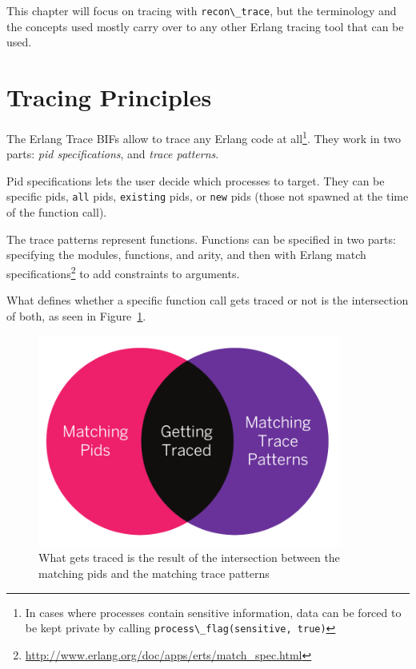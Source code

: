 \documentclass[11pt, oneside]{book}   	%
\newcommand{\module}[1]{\Verb`#1`}
\newcommand{\expression}[1]{\Verb`#1`}
\begin{document}
This chapter will focus on tracing with \module{recon\_trace}, but the terminology and the concepts used mostly carry over to any other Erlang tracing tool that can be used.

\section{Tracing Principles}
\label{sec:tracing-princples}

The Erlang Trace BIFs allow to trace any Erlang code at all\footnote{In cases where processes contain sensitive information, data can be forced to be kept private by calling \expression{process\_flag(sensitive, true)}}. They work in two parts: \emph{pid specifications}, and \emph{trace patterns}.

Pid specifications lets the user decide which processes to target. They can be specific pids, \expression{all} pids, \expression{existing} pids, or \expression{new} pids (those not spawned at the time of the function call).

The trace patterns represent functions. Functions can be specified in two parts: specifying the modules, functions, and arity, and then with Erlang match specifications\footnote{\href{http://www.erlang.org/doc/apps/erts/match\_spec.html}{http://www.erlang.org/doc/apps/erts/match\_spec.html}} to add constraints to arguments.

What defines whether a specific function call gets traced or not is the intersection of both, as seen in Figure~\ref{fig:tracing-venn}.

\begin{figure}
  \includegraphics[max height=7cm]{tracing-venn.pdf}%
  \centering%
  \caption{What gets traced is the result of the intersection between the matching pids and the matching trace patterns}%
   \label{fig:tracing-venn}
\end{figure}
\end{document}
